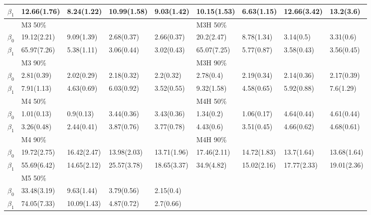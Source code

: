 \documentclass[12pt]{article}
\begin{document}
\begin{center}
\begin{table}[h]
\begin{tabular}[tb]{cllllllll}
$\beta_1$ & 12.66(1.76) & 8.24(1.22)  & 10.99(1.58) & 9.03(1.42)  & 10.15(1.53) & 6.63(1.15)  & 12.66(3.42) & 13.2(3.6)   \\
\hline         \hline
          & M3 50\%     &             &             &             & M3H 50\%    &             &             &             \\
$\beta_0$ & 19.12(2.21) & 9.09(1.39)  & 2.68(0.37)  & 2.66(0.37)  & 20.2(2.47)  & 8.78(1.34)  & 3.14(0.5)   & 3.31(0.6)   \\
$\beta_1$ & 65.97(7.26) & 5.38(1.11)  & 3.06(0.44)  & 3.02(0.43)  & 65.07(7.25) & 5.77(0.87)  & 3.58(0.43)  & 3.56(0.45)  \\
          & M3 90\%     &             &             &             & M3H 90\%    &             &             &             \\
$\beta_0$ & 2.81(0.39)  & 2.02(0.29)  & 2.18(0.32)  & 2.2(0.32)   & 2.78(0.4)   & 2.19(0.34)  & 2.14(0.36)  & 2.17(0.39)  \\
$\beta_1$ & 7.91(1.13)  & 4.63(0.69)  & 6.03(0.92)  & 3.52(0.55)  & 9.32(1.58)  & 4.58(0.65)  & 5.92(0.88)  & 7.6(1.29)   \\
\hline         \hline
          & M4 50\%     &             &             &             & M4H 50\%    &             &             &             \\
$\beta_0$ & 1.01(0.13)  & 0.9(0.13)   & 3.44(0.36)  & 3.43(0.36)  & 1.34(0.2)   & 1.06(0.17)  & 4.64(0.44)  & 4.61(0.44)  \\
$\beta_1$ & 3.26(0.48)  & 2.44(0.41)  & 3.87(0.76)  & 3.77(0.78)  & 4.43(0.6)   & 3.51(0.45)  & 4.66(0.62)  & 4.68(0.61)  \\
          & M4 90\%     &             &             &             & M4H 90\%    &             &             &             \\
$\beta_0$ & 19.72(2.75) & 16.42(2.47) & 13.98(2.03) & 13.71(1.96) & 17.46(2.11) & 14.72(1.83) & 13.7(1.64)  & 13.68(1.64) \\
$\beta_1$ & 55.69(6.42) & 14.65(2.12) & 25.57(3.78) & 18.65(3.37) & 34.9(4.82)  & 15.02(2.16) & 17.77(2.33) & 19.01(2.36) \\
\hline         \hline
          & M5 50\%     &             &             &             &             &             &             &             \\
$\beta_0$ & 33.48(3.19) & 9.63(1.44)  & 3.79(0.56)  & 2.15(0.4)   &             &             &             &             \\
$\beta_1$ & 74.05(7.33) & 10.09(1.43) & 4.87(0.72)  & 2.7(0.66)   &             &             &             &             \\

\end{tabular}
\end{table}
\end{center}
\end{document}
